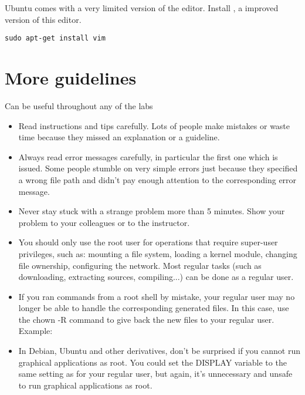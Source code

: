 Ubuntu comes with a very limited version of the 
editor. Install , a improved version of this editor.

\begin{verbatim}
sudo apt-get install vim
\end{verbatim}

\section{More guidelines}

Can be useful throughout any of the labs

\begin{itemize}

\item Read instructions and tips carefully. Lots of people make
  mistakes or waste time because they missed an explanation or a
  guideline.

\item Always read error messages carefully, in particular the first
  one which is issued. Some people stumble on very simple errors just
  because they specified a wrong file path and didn't pay enough
  attention to the corresponding error message.

\item Never stay stuck with a strange problem more than 5
  minutes. Show your problem to your colleagues or to the instructor.

\item You should only use the root user for operations that require
  super-user privileges, such as: mounting a file system, loading a
  kernel module, changing file ownership, configuring the
  network. Most regular tasks (such as downloading, extracting
  sources, compiling...) can be done as a regular user.

\item If you ran commands from a root shell by mistake, your regular
  user may no longer be able to handle the corresponding generated
  files. In this case, use the chown -R command to give back the new
  files to your regular user.\\
  Example: 

\item In Debian, Ubuntu and other derivatives, don't be surprised if
  you cannot run graphical applications as root. You could set the
  DISPLAY variable to the same setting as for your regular user, but
  again, it's unnecessary and unsafe to run graphical applications as
  root.

\end{itemize}

